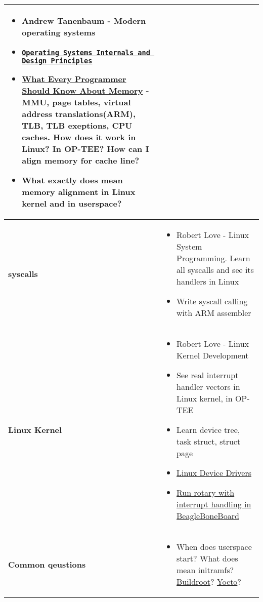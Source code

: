 \documentclass{article}
\begin{document}
\begin{tabular}{ | p{4cm} | p{15cm} | }
\begin{itemize}[noitemsep, topsep=5pt, parsep=0pt, partopsep=0pt]
			\item Andrew Tanenbaum - Modern operating systems
			\item \href{https://dinus.ac.id/repository/docs/ajar/Operating_System.pdf}{\texttt{Operating Systems Internals and Design Principles}}
			\item \href{https://people.freebsd.org/~lstewart/articles/cpumemory.pdf}{What Every Programmer Should Know About Memory}
			 - MMU, page tables, virtual address translations(ARM), TLB, TLB exeptions, CPU caches. How does it work in Linux? In OP-TEE?
			 How can I align memory for cache line?
			\item What exactly does mean memory alignment in Linux kernel and in userspace?
		\end{itemize} \\
		\hline
		\vspace{5pt}
		\textbf{syscalls}
		&
		\begin{itemize}[noitemsep, topsep=5pt, parsep=0pt, partopsep=0pt]
			\item Robert Love - Linux System Programming. Learn all syscalls and see its handlers in Linux
			\item Write syscall calling with ARM assembler
		\end{itemize} \\
		\hline
		\vspace{5pt}
		\textbf{Linux Kernel}
		&
		\begin{itemize}[noitemsep, topsep=5pt, parsep=0pt, partopsep=0pt]
			\item Robert Love - Linux Kernel Development
			\item See real interrupt handler vectors in Linux kernel, in OP-TEE
			\item Learn device tree, task struct, struct page
			\item \href{https://lwn.net/Kernel/LDD3/}{Linux Device Drivers}
			\item \href{http://www.embeddedlinux.org.cn/essentiallinuxdevicedrivers/final/ch04lev1sec2.html#ch04lev1sec2}{Run rotary with interrupt handling in BeagleBoneBoard}
		\end{itemize} \\
		\hline
		\vspace{5pt}
		\textbf{Common qeustions}
		&
		\begin{itemize}[noitemsep, topsep=5pt, parsep=0pt, partopsep=0pt]
			\item When does userspace start? What does mean initramfs? \href{https://bootlin.com/training/buildroot/}{Buildroot}? \href{https://bootlin.com/training/yocto/}{Yocto}?

\end{itemize}
\end{tabular}
\end{document}
